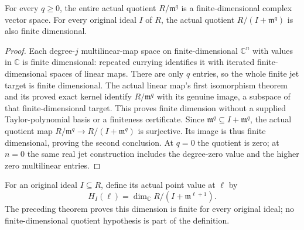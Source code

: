 \begin{theorem}
\label{hir:actual-point-quotient-finite-dimensional}
\leanok
{}
For every $q\ge0$, the entire actual quotient $R/\mathfrak m^q$ is a
finite-dimensional complex vector space. For every original ideal $I$ of
$R$, the actual quotient $R/(I+\mathfrak m^q)$ is also finite dimensional.
\end{theorem}
\begin{proof}
Each degree-$j$ multilinear-map space on finite-dimensional $\mathbb C^n$
with values in $\mathbb C$ is finite dimensional: repeated currying
identifies it with iterated finite-dimensional spaces of linear maps.
There are only $q$ entries, so the whole finite jet target is finite
dimensional. The actual linear map's first isomorphism theorem and its
proved exact kernel identify $R/\mathfrak m^q$ with its genuine image,
a subspace of that finite-dimensional target. This proves finite dimension
without a supplied Taylor-polynomial basis or a finiteness certificate.
Since $\mathfrak m^q\subseteq I+\mathfrak m^q$, the actual quotient map
$R/\mathfrak m^q\to R/(I+\mathfrak m^q)$ is surjective. Its image is thus
finite dimensional, proving the second conclusion. At $q=0$ the quotient
is zero; at $n=0$ the same real jet construction includes the degree-zero
value and the higher zero multilinear entries.
\end{proof}

\begin{definition}
\label{hir:actual-hilbert-samuel-point-value}
\leanok
{}
For an original ideal $I\subseteq R$, define its actual point value at
$\ell$ by
\[
 H_I(\ell)=\dim_{\mathbb C}R/(I+\mathfrak m^{\ell+1}).
\]
The preceding theorem proves this dimension is finite for every original
ideal; no finite-dimensional quotient hypothesis is part of the definition.
\end{definition}
